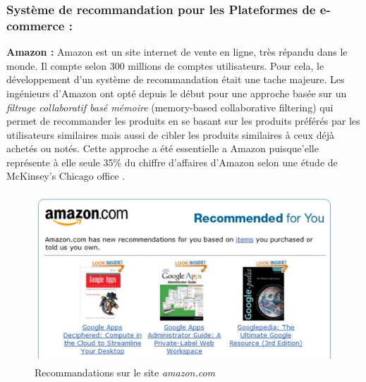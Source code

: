         \subsubsection*{Système de recommandation pour les Plateformes de e-commerce :}
        \textbf{Amazon :} Amazon est un site internet de vente en ligne, très répandu dans le monde. Il compte selon \cite{refamazonus} 300 millions de comptes utilisateurs. Pour cela, le développement d'un système de recommandation était une tache majeure. Les ingénieurs d'Amazon ont opté depuis le début pour une approche basée sur un \emph{filtrage collaboratif basé mémoire} (memory-based collaborative filtering) qui permet de recommander les produits en se basant sur les produits préférés par les utilisateurs similaires mais aussi de cibler les produits similaires à ceux déjà achetés ou notés\cite{amazon}. Cette approche a été essentielle a Amazon puisque’elle représente à elle seule 35\% du chiffre d'affaires d'Amazon selon une étude de McKinsey's Chicago office \cite{McKinsey}.\\ 
            \begin{figure}[H]
                \centering
                   \includegraphics[height=180pt,width=350pt]{img/chapter1/amazon.jpg}
                \caption{Recommandations sur le site \emph{amazon.com}}
            \end{figure}

